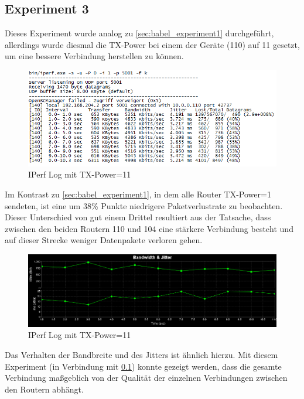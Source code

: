 \documentclass[10pt]{scrartcl}
\begin{document}
	\subsection{Experiment 3}\label{sec:babel_experiment3}
	Dieses Experiment wurde analog zu \ref{sec:babel_experiment1} durchgeführt, allerdings wurde diesmal die TX-Power bei einem der Geräte (110) auf 11 gesetzt, um eine bessere Verbindung herstellen zu können.	

	\begin{figure}
        \centering
                \includegraphics[width=\textwidth]{img/Babel_TX11_Protokoll}
        \caption{IPerf Log mit TX-Power=11}
        \label{img:babel_iperf_tx11}
	\end{figure}
	
Im Kontrast zu \ref{sec:babel_experiment1}, in dem alle Router TX-Power=1 sendeten, ist eine um 38\% Punkte niedrigere Paketverlustrate zu beobachten. Dieser Unterschied von gut einem Drittel resultiert aus der Tatsache, dass zwischen den beiden Routern 110 und 104 eine stärkere Verbindung besteht und auf dieser Strecke weniger Datenpakete verloren gehen.

	\begin{figure}
        \centering
                \includegraphics[width=\textwidth]{img/4_UDP_Babel_TX1_10MB}
        \caption{IPerf Log mit TX-Power=11}
        \label{img:babel_iperf_graph_tx11}
	\end{figure}
	
Das Verhalten der Bandbreite und des Jitters ist ähnlich hierzu.
Mit diesem Experiment (in Verbindung mit \ref{sec:babel_experiment3}) konnte gezeigt werden, dass die gesamte Verbindung maßgeblich von der Qualität der einzelnen Verbindungen zwischen den Routern abhängt.
\end{document}
